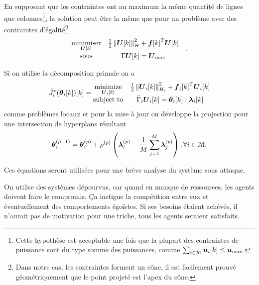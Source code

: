 \documentclass[../main.tex]{subfiles}
\begin{document}
En supposant que les contraintes ont au maximum la même quantité de lignes que colonnes\footnote{Cette hypothèse est acceptable une fois que la plupart des contraintes de puissance sont du type somme des puissances, comme $\sum_{i\in\mathcal{M}}\boldsymbol{u}_{i}[k]\leq\boldsymbol{u}_{\max}$.}, la solution peut être la même que pour un problème avec des contraintes d'égalité\footnote{Dans notre cas, les contraintes forment un cône, il est facilement prouvé géométriquement que le point projeté est l'apex du cône.}
\begin{equation}
  \label{eq:qp_standard_form_equality}
  \begin{aligned}
    \begin{matrix}
      \mathop{\textrm{minimiser}}\limits_{\boldsymbol{U}[k]} &
                                                 \frac{1}{2}\left\lVert\boldsymbol{U}[k]\right\rVert^{2}_{H} + {\boldsymbol{f}[k]}^{T}\boldsymbol{U}[k] &\\
      \mathrm{sous} &
                             \bar{\Gamma}\boldsymbol{U}[k]= {\boldsymbol{U}}_{\text{max}}
    \end{matrix}
  \end{aligned}.
\end{equation}

Si on utilise la décomposition primale on a
\begin{equation}
  \label{eq:example_local_problem_reprise_fr}
   \eqoptobji(\thetaik)[k]= \begin{matrix}
    \minimize\limits_{\vec{U}_{i}[k]}&\frac{1}{2}\norm{\vec{U}_{i}[k]}^{2}_{H_{i}} + {\vec{f}_{i}[k]}^{T}\vec{U}_{i}[k]\\
    \mathrm{subject~ to} & \bar{\Gamma}_{i}\vec{U}_{i}[k] = \thetaik:\lambdaik
  \end{matrix}
\end{equation}
comme problèmes locaux et pour la mise à jour on développe la projection pour une intersection de hyperplans résultant
\begin{equation}
  \label{eq:example_projectedSubgradient_lambda_reprise_fr}
 \boldsymbol{\theta}_{i}^{(p+1)}=\boldsymbol{\theta}_{i}^{(p)}+\rho^{(p)}\left(\boldsymbol{\lambda}_{i}^{(p)}-\frac{1}{M}\sum_{j=1}^{M}\boldsymbol{\lambda}_j^{(p)}\right),\forall i\in\mathcal{M}.
\end{equation}

Ces équations seront utilisées pour une brève analyse du système sous attaque.
\begin{remark}
  On utilise des systèmes dépourvus, car quand en manque de ressources, les agents doivent faire le compromis.
  Ça instigue la compétition entre eux et éventuellement des comportements égoïstes.
  Si ses besoins étaient achévés, il n'aurait pas de motivation pour une triche, tous les agents seraient satisfaits.
\end{remark}
\end{document}

